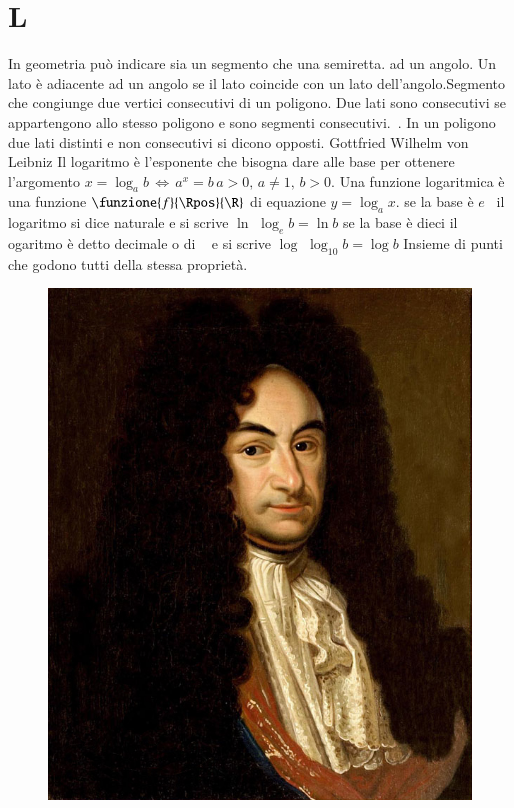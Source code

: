 \chapter{L}
\vspace{5mm} 
In geometria può indicare sia un segmento che una semiretta. ad un angolo. Un lato è adiacente ad un angolo se il lato coincide con un lato dell'angolo.Segmento che congiunge due vertici consecutivi di un poligono.
Due lati sono consecutivi se appartengono allo stesso poligono e sono segmenti consecutivi.\pointsto~. In un poligono due lati distinti e non consecutivi si dicono opposti.
Gottfried Wilhelm von Leibniz
Il logaritmo è l'esponente che bisogna dare alle base per ottenere l'argomento $x=\log_{a}b\,\Longleftrightarrow\,a^x=b\,a>0,\,a\neq1,\,b>0$. Una funzione logaritmica è una funzione $\funzione{f}{\Rpos}{\R}$ di equazione $y=\log_{a}x$. se la base è $e$\pointsto~ il logaritmo si dice naturale  e si scrive $\ln$
$\log_{e}b=\ln b$ se la base è dieci il ogaritmo è detto decimale o di \pointsto~ e si scrive $\log$
$\log_{10}b=\log b$
Insieme di punti che godono tutti della stessa proprietà.
\begin{figure}
	\centering
	\label{fig:leibnizhannover}
	\includegraphics[width=0.7\linewidth]{Figure/L/Leibniz_Hannover}
\end{figure}
